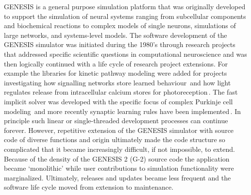 \documentclass[12pt]{article}
\begin{document}
GENESIS is a general purpose simulation platform that was originally
developed to support the simulation of neural systems ranging from
subcellular components and biochemical reactions to complex models of
single neurons, simulations of large networks, and systems-level
models.
The software development of the GENESIS simulator was initiated during
the 1980's through research projects that addressed specific
scientific questions in computational neuroscience and was then
logically continued with a life cycle of research project extensions.
For example the libraries for kinetic pathway modeling were added for
projects investigating how signalling networks store learned
behaviour\,\cite{bhalla99:_emerg} and how light regulates release from
intracellular calcium stores for
photoreception\,\cite{blackwell00:_eviden_distin_light_induc_calcium}.
The fast implicit solver was developed with the specific focus of
complex Purkinje cell modeling\,\cite{deschutter94:_purkin_i,
  deschutter94:_purkin_ii} and more recently synaptic learning rules
have been
implemented\,\cite{guenay08:_chann_densit_distr_explain_spikin}.  In
principle such linear or single-threaded development processes can
continue forever.  However, repetitive extension of the GENESIS
simulator with source code of diverse functions and origin ultimately
made the code structure so complicated that it became increasingly
difficult, if not impossible, to extend.  Because of the density of
the GENESIS 2 (G-2) source code the application became `monolithic'
while user contributions to simulation functionality were
marginalized. Ultimately, releases and updates became less frequent
and the software life cycle moved from extension to maintenance.

\end{document}
